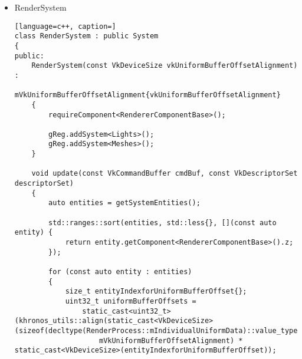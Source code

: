 \begin{itemize}
\begin{lstlisting}[language=c++, caption=]
            if (movementDirection == -1.f)
            {
                offsetX *= -1;
                offsetZ *= -1;
            }

            auto& playerPosition = player.getComponent<TransformComponent>().pos;
            playerPosition.x += offsetX;
            playerPosition.z += offsetZ;
        }
\end{lstlisting}
\begin{lstlisting}[language=c++, caption=]
        for (size_t controllerIndex{}; controllerIndex < controllers.controllerCount; ++controllerIndex)
        {
            const auto flyState = controllers.getFlyState(controllerIndex);
            if (flyState)
            {
                const auto controllerPose = controllers.getPose(controllerIndex)[2];

                // TODO: something is wrong with this code, investigate it
                if ((!controllerPose.isNan()) || (controllerPose == math::Vec3{0.f}))
                {
                    const math::Vec3 forward{controllers.getPose(controllerIndex)[2]};
                    player.getComponent<TransformComponent>().pos += forward * player.getComponent<RigidBodyComponent>().velocity * dt;
                }
                else
                {
                    TS_WARN(std::format("Controller no. {} can not be located.", controllerIndex).c_str());
                }
            }
        }
\end{lstlisting}
    \item RenderSystem
    \label{sec:renderer_system}
\begin{lstlisting}[language=c++, caption=]
class RenderSystem : public System
{
public:
    RenderSystem(const VkDeviceSize vkUniformBufferOffsetAlignment) :
        mVkUniformBufferOffsetAlignment{vkUniformBufferOffsetAlignment}
    {
        requireComponent<RendererComponentBase>();

        gReg.addSystem<Lights>();
        gReg.addSystem<Meshes>();
    }

    void update(const VkCommandBuffer cmdBuf, const VkDescriptorSet descriptorSet)
    {
        auto entities = getSystemEntities();

        std::ranges::sort(entities, std::less{}, [](const auto entity) {
            return entity.getComponent<RendererComponentBase>().z;
        });

        for (const auto entity : entities)
        {
            size_t entityIndexforUniformBufferOffset{};
            uint32_t uniformBufferOffsets = 
                static_cast<uint32_t>(khronos_utils::align(static_cast<VkDeviceSize>(sizeof(decltype(RenderProcess::mIndividualUniformData)::value_type)),
                    mVkUniformBufferOffsetAlignment) * static_cast<VkDeviceSize>(entityIndexforUniformBufferOffset));


\end{lstlisting}
\end{itemize}
